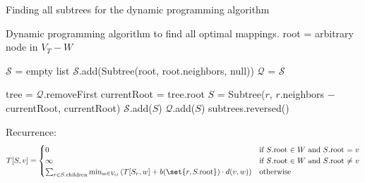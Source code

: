 \documentclass[language=english, number=1]{../lib/homework}
\begin{document}
    \begin{algorithm}
        \caption{Finding all subtrees for the dynamic programming algorithm}
        \label{alg:idk}
        \begin{algorithmic}[1]
            \Statex Dynamic programming algorithm to find all optimal mappings.
                \State root = arbitrary node in $V_T - W$

                \State $\mathcal S$ = empty list
                \State $\mathcal S$.add(Subtree(root, root.neighbors, null)) 
                \State $\mathcal Q$ = $\mathcal S$

                    \State tree = $\mathcal Q$.removeFirst
                    \State currentRoot = tree.root
                        \State $S$ = Subtree($r$, $r$.neighbors $-$ currentRoot, currentRoot)
                        \State $\mathcal S$.add($S$)
                        \State $\mathcal Q$.add($S$)
                    \EndFor
                \EndWhile
                \State \Return subtrees.reversed()
            \EndProcedure
        \end{algorithmic}
    \end{algorithm}

    Recurrence:
    \[
        T[S, v] = \begin{cases}
                      0 &\text{if $S$.root $\in W$ and $S$.root = $v$} \\
                      \infty &\text{if $S$.root $\in W$ and $S$.root $\neq$ $v$} \\
                      \sum_{r \in S.\text{children}} \min_{w \in V_G} \left( T[S_r, w] + b(\set{r, S.\text{root}}) \cdot d(v, w) \right) &\text{otherwise} \\
        \end{cases}
    \]
\end{document}
